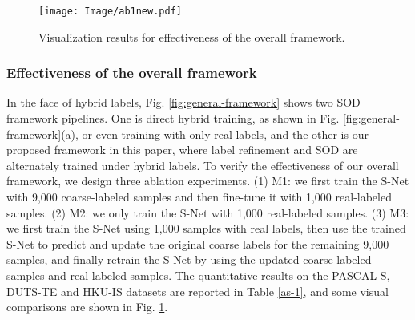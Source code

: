 \documentclass[journal]{IEEEtran}
\begin{document}
\begin{table}[!t]
\centering
\renewcommand\arraystretch{1.2}
    \begin{spacing}{1}
    \caption{The effectiveness analyses of overall framework on the PASCAL-S, DUTS-TE and HKU-IS datasets.}
    \label{as-1}
    \end{spacing}
\end{table}
\renewcommand\arraystretch{2}
\begin{figure}[!t]
	\centering
	\texttt{[image: Image/ab1new.pdf]}
	\caption{Visualization results for effectiveness of the overall framework.}
	\label{visualization-as-1}
\end{figure}
\subsubsection{Effectiveness of the overall framework}
In the face of hybrid labels, Fig. \ref{fig:general-framework} shows two SOD framework pipelines. One is direct hybrid training, as shown in Fig. \ref{fig:general-framework}(a), or even training with only real labels, and the other is our proposed framework in this paper, where label refinement and SOD are alternately trained under hybrid labels. To verify the effectiveness of our overall framework, we design three ablation experiments.
(1) M1: we first train the S-Net with 9,000 coarse-labeled samples and then fine-tune it with 1,000 real-labeled samples.
(2) M2: we only train the S-Net with 1,000 real-labeled samples.
(3) M3: we first train the S-Net using 1,000 samples with real labels, then use the trained S-Net to predict and update the original coarse labels for the remaining 9,000 samples, and finally retrain the S-Net by using the updated coarse-labeled samples and real-labeled samples.
The quantitative results on the PASCAL-S, DUTS-TE and HKU-IS datasets are reported in Table \ref{as-1}, and some visual comparisons are shown in Fig. \ref{visualization-as-1}.
\end{document}
